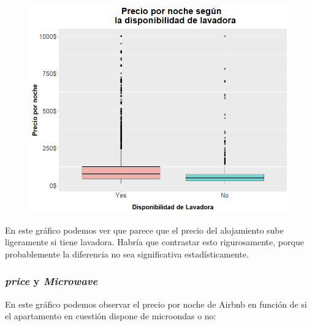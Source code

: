 \documentclass{article}
\begin{document}
\vspace{0.35cm}
\begin{figure}[h]
\hspace*{-0.15cm}
\centering
\includegraphics[scale = 0.6]{boxplot_precio_Washer}
\end{figure}
\vspace{0.15cm}

En este gráfico podemos ver que parece que el precio del alojamiento sube ligeramente si tiene lavadora. Habría que contrastar esto rigurosamente, porque probablemente la diferencia no sea significativa estadísticamente.

\clearpage
\subsubsection{\emph{price} y \emph{Microwave}}

En este gráfico podemos observar el precio por noche de Airbnb en función de si el apartamento en cuestión dispone de microondas o no:
\end{document}
